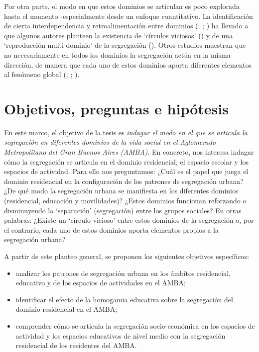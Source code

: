 \documentclass[
  spanish,
  a4paper,%
  chapterprefix=true,%
  DIV=calc,%
  twoside]{scrbook}%
\providecommand{\tightlist}{%
  \setlength{\itemsep}{0pt}\setlength{\parskip}{0pt}}
\begin{document}
Por otra parte, el modo en que estos dominios se articulan es poco
explorada hasta el momento -especialmente desde un enfoque
cuantitativo. La identificación de cierta interdependencia y
retroalimentación entre dominios (; ; ) ha llevado a que algunos autores planteen la existencia de
`círculos viciosos' () y de una `reproducción multi-dominio'
de la segregación (). Otros estudios muestran que no
necesariamente en todos los dominios la segregación actúa en la misma
dirección, de manera que cada uno de estos dominios aporta diferentes
elementos al fenómeno global (; ; ).

\section{Objetivos, preguntas e hipótesis}\label{objetivos-preguntas-e-hipuxf3tesis}

En este marco, el objetivo de la tesis es \emph{indagar el modo en el que se
articula la segregación en diferentes dominios de la vida social en el
Aglomerado Metropolitano del Gran Buenos Aires (AMBA)}. En concreto, nos
interesa indagar cómo la segregación se articula en el dominio
residencial, el espacio escolar y los espacios de actividad. Para ello
nos preguntamos: ¿Cuál es el papel que juega el dominio residencial en
la configuración de los patrones de segregación urbana? ¿De qué modo la
segregación urbana se manifiesta en los diferentes dominios
(residencial, educación y movilidades)? ¿Estos dominios funcionan
reforzando o disminuyendo la `separación' (segregación) entre los grupos
sociales? En otras palabras: ¿Existe un `círculo vicioso' entre estos
dominios de la segregación o, por el contrario, cada uno de estos
dominios aporta elementos propios a la segregación
urbana?

A partir de este planteo general, se proponen los siguientes objetivos
específicos:

\begin{itemize}
\tightlist
\item
  analizar los patrones de segregación urbana en los ámbitos
  residencial, educativo y de los espacios de actividades en el AMBA;
\item
  identificar el efecto de la homogamia educativa sobre la segregación
  del dominio residencial en el AMBA;
\item
  comprender cómo se articula la segregación socio-económica en los
  espacios de actividad y los espacios educativos de nivel medio con
  la segregación residencial de los residentes del AMBA.
\end{itemize}
\end{document}
